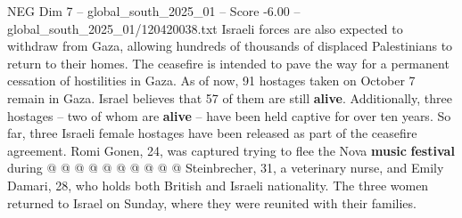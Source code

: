 \begin{textsample}{NEG Dim 7 – global\_south\_2025\_01 – Score -6.00 – global\_south\_2025\_01/120420038.txt}
Israeli forces are also expected to withdraw from Gaza, allowing hundreds of thousands of displaced Palestinians to return to their homes.
The ceasefire is intended to pave the way for a permanent cessation of hostilities in Gaza.
As of now, 91 hostages taken on October 7 remain in Gaza.
Israel believes that 57 of them are still \textbf{alive}.
Additionally, three hostages -- two of whom are \textbf{alive} -- have been held captive for over ten years.
So far, three Israeli female hostages have been released as part of the ceasefire agreement.
Romi Gonen, 24, was captured trying to flee the Nova \textbf{music} \textbf{festival} during @ @ @ @ @ @ @ @ @ @ Steinbrecher, 31, a veterinary nurse, and Emily Damari, 28, who holds both British and Israeli nationality.
The three women returned to Israel on Sunday, where they were reunited with their families.

\end{textsample}
